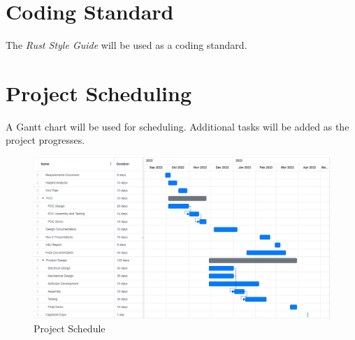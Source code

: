 \documentclass[titlepage]{article}
\begin{document}
\section{Coding Standard}

The \textit{Rust Style Guide} will be used as a coding standard.

\section{Project Scheduling}

A Gantt chart will be used for scheduling. Additional tasks will be added as the project progresses.

\begin{figure} [H]
\begin{center}
	\includegraphics [width=1\textwidth] {Figures/Gantt.pdf}
	\caption{Project Schedule}
	\label{fig:Gantt}
	\end{center}
\end{figure}
\end{document}
